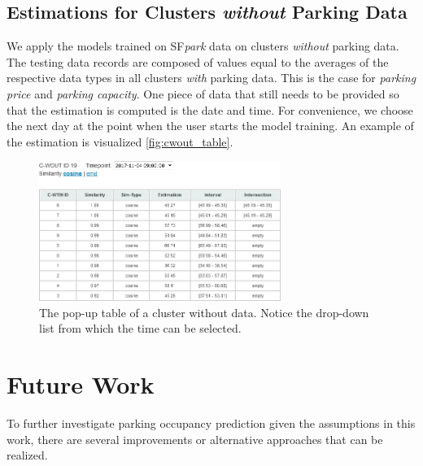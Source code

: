 \subsection{Estimations for Clusters \textit{without} Parking Data}
\label{evaluation:estimations_cwout}
We apply the models trained on SF\textit{park} data on clusters \textit{without} parking data.
The testing data records are composed of values equal to the averages of the respective data types in all clusters \textit{with} parking data.
This is the case for \textit{parking price} and \textit{parking capacity}.
One piece of data that still needs to be provided so that the estimation is computed is the date and time.
For convenience, we choose the next day at the point when the user starts the model training. 
An example of the estimation is visualized \autoref{fig:cwout_table}.

\begin{figure}[!ht]
	\centering
	\includegraphics[width=0.7\textwidth]{graphics/cwout_cosine_table.png}
	\caption{The pop-up table of a cluster without data.
Notice the drop-down list from which the time can be selected.}
	\label{fig:cwout_table}
\end{figure}

\section{Future Work}
\label{conclusion:future_work}
To further investigate parking occupancy prediction given the assumptions in this work, there are several improvements or alternative approaches that can be realized.

